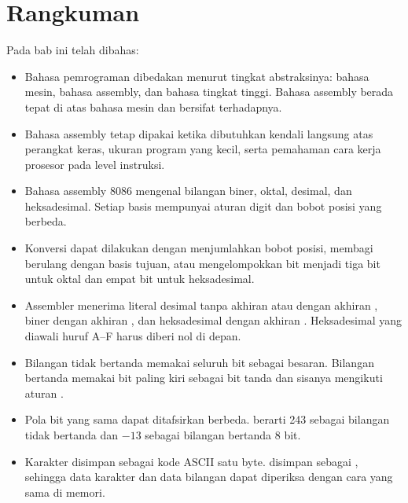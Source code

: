 \section{Rangkuman}
\label{sec:rangkuman-bab3}

Pada bab ini telah dibahas:

\begin{itemize}
    \item Bahasa pemrograman dibedakan menurut tingkat abstraksinya:
          bahasa mesin, bahasa assembly, dan bahasa tingkat tinggi.
          Bahasa assembly berada tepat di atas bahasa mesin dan
          bersifat  terhadapnya.

    \item Bahasa assembly tetap dipakai ketika dibutuhkan kendali
          langsung atas perangkat keras, ukuran program yang kecil,
          serta pemahaman cara kerja prosesor pada level instruksi.

    \item Bahasa assembly 8086 mengenal bilangan biner, oktal,
          desimal, dan heksadesimal. Setiap basis mempunyai aturan
          digit dan bobot posisi yang berbeda.

    \item Konversi dapat dilakukan dengan menjumlahkan bobot posisi,
          membagi berulang dengan basis tujuan, atau mengelompokkan
          bit menjadi tiga bit untuk oktal dan empat bit untuk
          heksadesimal.

    \item Assembler menerima literal desimal tanpa akhiran atau
          dengan akhiran , biner dengan akhiran , dan
          heksadesimal dengan akhiran . Heksadesimal yang
          diawali huruf A--F harus diberi nol di depan.

    \item Bilangan tidak bertanda memakai seluruh bit sebagai
          besaran. Bilangan bertanda memakai bit paling kiri sebagai
          bit tanda dan sisanya mengikuti aturan
          .

    \item Pola bit yang sama dapat ditafsirkan berbeda. 
          berarti 243 sebagai bilangan tidak bertanda dan $-13$
          sebagai bilangan bertanda 8 bit.

    \item Karakter disimpan sebagai kode ASCII satu byte. 
          disimpan sebagai , sehingga data karakter dan data
          bilangan dapat diperiksa dengan cara yang sama di memori.
\end{itemize}

